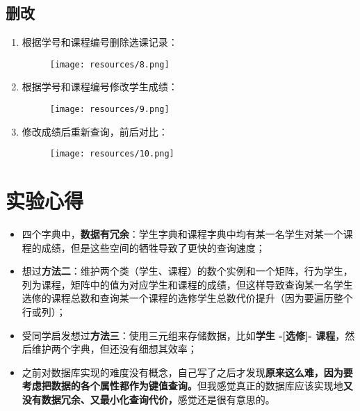 \documentclass[UTF8]{ctexart}
\begin{document}
    \subsection{删改}
    \begin{enumerate}
        \item 根据学号和课程编号删除选课记录：
        \begin{figure}[H]
            \centering
            \texttt{[image: resources/8.png]}
        \end{figure}
        \item 根据学号和课程编号修改学生成绩：
        \begin{figure}[H]
            \centering
            \texttt{[image: resources/9.png]}
        \end{figure}
        \item 修改成绩后重新查询，前后对比：
        \begin{figure}
            \centering
            \texttt{[image: resources/10.png]}
        \end{figure}
    \end{enumerate}
    \section{实验心得}
    \begin{itemize}
        \item 四个字典中，\textbf{数据有冗余}：学生字典和课程字典中均有某一名学生对某一个课程的成绩，但是这些空间的牺牲导致了更快的查询速度；
        \item 想过\textbf{方法二}：维护两个类（学生、课程）的数个实例和一个矩阵，行为学生，列为课程，矩阵中的值为对应学生和课程的成绩，但这样导致查询某一名学生选修的课程总数和查询某一个课程的选修学生总数代价提升（因为要遍历整个行或列）；
        \item 受同学启发想过\textbf{方法三}：使用三元组来存储数据，比如\textbf{学生 -[选修]- 课程}，然后维护两个字典，但还没有细想其效率；
        \item 之前对数据库实现的难度没有概念，自己写了之后才发现\textbf{原来这么难，因为要考虑把数据的各个属性都作为键值查询。}但我感觉真正的数据库应该实现地\textbf{又没有数据冗余、又最小化查询代价，}感觉还是很有意思的。
    \end{itemize}
\end{document}

